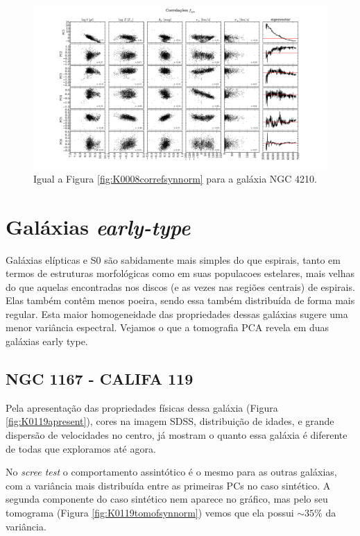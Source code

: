 \begin{figure}
    \includegraphics[width=1.3\textwidth, angle=-90]{figuras/K0518-correl-f_syn_norm-PCvsPhys.pdf}
	\caption[Correlações PCs vs. par\^ametros f\'isicos -um padrão de velocidades $f_{syn}$ - NGC 4210.]
	{Igual a Figura \ref{fig:K0008correfsynnorm} para a galáxia NGC 4210.}
    \label{fig:K0518correfsynnorm}
\end{figure}

\section{Gal\'axias {\em early-type}}
\label{sec:result:elipt}

Galáxias elípticas e S0 são sabidamente mais simples do que espirais, tanto em termos de estruturas morfológicas como em
suas populacoes estelares, mais velhas do que aquelas encontradas nos discos (e as vezes nas regiões centrais) de
espirais. Elas também contêm menos poeira, sendo essa também distribuída de forma mais regular. Esta maior homogeneidade
das propriedades dessas galáxias sugere uma menor variância espectral. Vejamos o que a tomografia PCA revela em duas
galáxias early type.

\subsection{NGC 1167 - CALIFA 119}

Pela apresentação das propriedades físicas dessa galáxia (Figura \ref{fig:K0119apresent}), cores na imagem SDSS,
distribuição de idades, e grande dispersão de velocidades no centro, já mostram o quanto essa galáxia é diferente de
todas que exploramos até agora.

No {\em scree test} o comportamento assintótico é o mesmo para as outras galáxias, com a variância mais distribuída
entre as primeiras PCs no caso sintético. A segunda componente do caso sintético nem aparece no gráfico, mas pelo seu
tomograma (Figura \ref{fig:K0119tomofsynnorm}) vemos que ela possui $\sim 35\%$ da variância.

